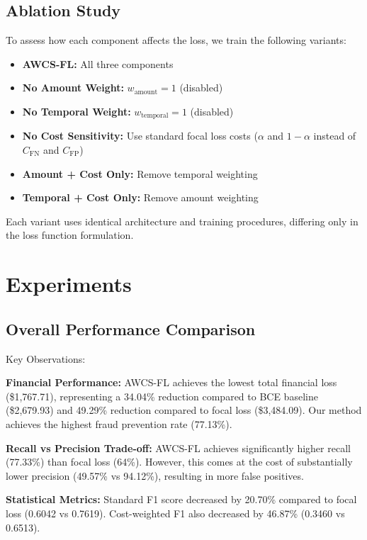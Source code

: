 \documentclass[10pt,twocolumn,letterpaper]{article}
\begin{document}
\subsection{Ablation Study}

To assess how each component affects the loss, we train the following variants:

\begin{itemize}
  \item \textbf{AWCS-FL:} All three components
  \item \textbf{No Amount Weight:} $w_{\text{amount}} = 1$ (disabled)
  \item \textbf{No Temporal Weight:} $w_{\text{temporal}} = 1$ (disabled)
  \item \textbf{No Cost Sensitivity:} Use standard focal loss costs ($\alpha$ and $1-\alpha$ instead of $C_{\text{FN}}$ and $C_{\text{FP}}$)
  \item \textbf{Amount + Cost Only:} Remove temporal weighting
  \item \textbf{Temporal + Cost Only:} Remove amount weighting
\end{itemize}

Each variant uses identical architecture and training procedures, differing only in the loss function formulation.

\section{Experiments}

\subsection{Overall Performance Comparison}

Key Observations:

\textbf{Financial Performance:} AWCS-FL achieves the lowest total financial loss (\$1,767.71), representing a 34.04\% reduction compared to BCE baseline (\$2,679.93) and 49.29\% reduction compared to focal loss (\$3,484.09). Our method achieves the highest fraud prevention rate (77.13\%).

\textbf{Recall vs Precision Trade-off:} AWCS-FL achieves significantly higher recall (77.33\%) than focal loss (64\%). However, this comes at the cost of substantially lower precision (49.57\% vs 94.12\%), resulting in more false positives.

\textbf{Statistical Metrics:} Standard F1 score decreased by 20.70\% compared to focal loss (0.6042 vs 0.7619). Cost-weighted F1 also decreased by 46.87\% (0.3460 vs 0.6513).
\end{document}

